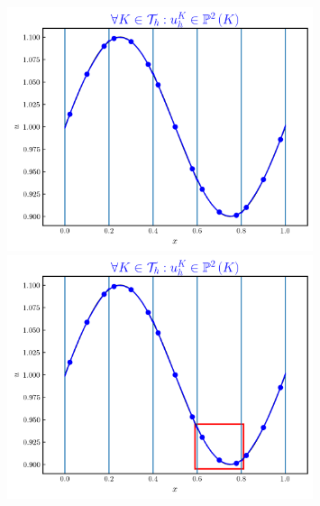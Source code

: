 \documentclass{beamer}
\begin{document}
\begin{frame}
\begin{figure}
\begin{overprint}
        \centering\includegraphics[width=0.8\textwidth]{./fig.sine_k2.png}
        \centering\includegraphics[width=0.8\textwidth]{./fig.sine_k2_box.png}
    \end{overprint}
  \end{figure}

\end{frame}
\end{document}
